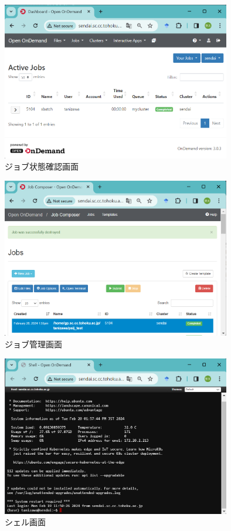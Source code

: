 \begin{figure}[tb]
    \centering
    \includegraphics[width=100mm]{./fig/activejobs.png}
    \caption{ジョブ状態確認画面}
    \label{activejobs}
\end{figure}


\begin{figure}[tb]
    \centering
    \includegraphics[width=100mm]{./fig/jobcomposer.png}
    \caption{ジョブ管理画面}
    \label{jobcomposer}
\end{figure}

\begin{figure}[tb]
    \centering
    \includegraphics[width=100mm]{./fig/shell.png}
    \caption{シェル画面}
    \label{shell}
\end{figure}


